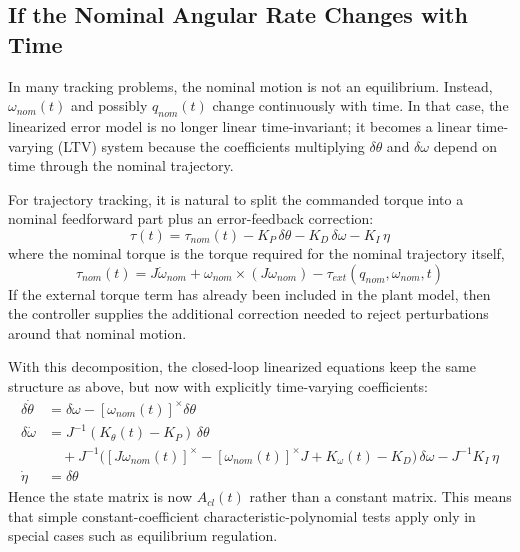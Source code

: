 \documentclass[11pt]{article}
\begin{document}
\subsection{If the Nominal Angular Rate Changes with Time}
In many tracking problems, the nominal motion is not an equilibrium. Instead, $\omega_{nom}(t)$ and possibly $q_{nom}(t)$ change continuously with time. In that case, the linearized error model is no longer linear time-invariant; it becomes a linear time-varying (LTV) system because the coefficients multiplying $\delta\theta$ and $\delta\omega$ depend on time through the nominal trajectory.

For trajectory tracking, it is natural to split the commanded torque into a nominal feedforward part plus an error-feedback correction:
\begin{equation}
    \tau(t) = \tau_{nom}(t) - K_{P} \, \delta\theta - K_{D} \, \delta\omega - K_{I} \, \eta
\end{equation}
where the nominal torque is the torque required for the nominal trajectory itself,
\begin{equation}
    \tau_{nom}(t) = J \dot{\omega}_{nom} + \omega_{nom} \times (J\omega_{nom}) - \tau_{ext}(q_{nom}, \omega_{nom}, t)
\end{equation}
If the external torque term has already been included in the plant model, then the controller supplies the additional correction needed to reject perturbations around that nominal motion.

With this decomposition, the closed-loop linearized equations keep the same structure as above, but now with explicitly time-varying coefficients:
\begin{align}
    \delta\dot{\theta} &= \delta\omega - [\omega_{nom}(t)]^\times \delta\theta \\
    \delta\dot{\omega} &= J^{-1} (K_{\theta}(t) - K_{P}) \, \delta\theta \\
    &\quad + J^{-1} \Big( [J\omega_{nom}(t)]^\times - [\omega_{nom}(t)]^\times J + K_{\omega}(t) - K_{D} \Big) \, \delta\omega - J^{-1} K_{I} \, \eta \\
    \dot{\eta} &= \delta\theta
\end{align}
Hence the state matrix is now $A_{cl}(t)$ rather than a constant matrix. This means that simple constant-coefficient characteristic-polynomial tests apply only in special cases such as equilibrium regulation.
\end{document}
